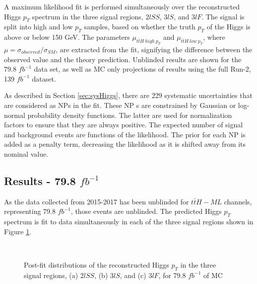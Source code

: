 A maximum likelihood fit is performed simultaneously over the reconstructed Higgs $p_T$ spectrum in the three signal regions, $2lSS$, $3lS$, and $3lF$. The signal is split into high and low $p_T$ samples, based on whether the truth $p_T$ of the Higgs is above or below 150 GeV. The parameters $\mu_{t\bar{t}H\ high\ p_T}$ and $\mu_{t\bar{t}H\ low\ p_T}$, where $\mu = \sigma_{observed}/\sigma_{SM} $, are extracted from the fit, signifying the difference between the observed value and the theory prediction. Unblinded results are shown for the 79.8 $fb^{-1}$ data set, as well as MC only projections of results using the full Run-2, 139 $fb^{-1}$ dataset.

As described in Section \ref{sec:sysHiggs}, there are 229 systematic uncertainties that are considered as NPs in the fit. These NP s are constrained by Gaussian or log-normal probability density functions. The latter are used for normalization factors to ensure that they are always positive. The expected number of signal and background events are functions of the likelihood. The prior for each NP is added as a penalty term, decreasing the likelihood as it is shifted away from its nominal value.

\subsection{Results - 79.8 $fb^{-1}$}
\label{sec:res80}

As the data collected from 2015-2017 has been unblinded for $t\bar{t}H-ML$ channels, representing 79.8 $fb^{-1}$, those events are unblinded. The predicted Higgs $p_T$ spectrum is fit to data simultaneously in each of the three signal regions shown in Figure \ref{fig:sigRegions80}.

\begin{figure}[H]
    \centering
    \\
    \caption{Post-fit distributions of the reconstructed Higgs $p_T$ in the three signal regions, (a) $2lSS$, (b) $3lS$, and (c) $3lF$, for 79.8 $fb^{-1}$ of MC}
    \label{fig:sigRegions80}
\end{figure}

